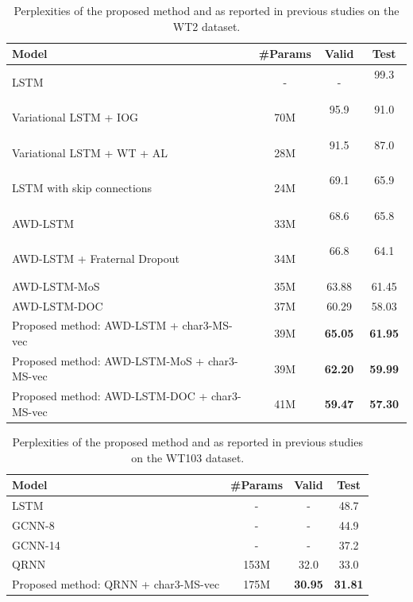 \documentclass[letterpaper]{article} %
\begin{document}
\begin{table}[!t]
  \centering
  \begin{tabular}{ l | c | c c }
  \toprule
  Model & \#Params & Valid & Test \\
  \midrule
  LSTM \cite{DBLP:journals/corr/GraveJU16} & - & - & 99.3 \ \  \\
  Variational LSTM + IOG \cite{takase-suzuki-nagata:2017:I17-2} & 70M & 95.9 \ \  & 91.0 \ \  \\
  Variational LSTM + WT + AL \cite{DBLP:journals/corr/InanKS16} & 28M & 91.5 \ \  & 87.0 \ \  \\
  LSTM with skip connections \cite{DBLP:journals/corr/MelisDB17} & 24M & 69.1 \ \  & 65.9 \ \  \\
  AWD-LSTM \cite{merityRegOpt} & 33M & 68.6 \ \  & 65.8 \ \  \\
  AWD-LSTM + Fraternal Dropout \cite{fraternal} & 34M & 66.8 \ \  & 64.1 \ \  \\
  AWD-LSTM-MoS \cite{DBLP:journals/corr/abs-1711-03953} & 35M & 63.88 & 61.45 \\
  AWD-LSTM-DOC \cite{D18-1489} & 37M & 60.29 & 58.03 \\
  \midrule
  Proposed method: AWD-LSTM + char3-MS-vec & 39M & {\bf 65.05} & {\bf 61.95} \\
  Proposed method: AWD-LSTM-MoS + char3-MS-vec & 39M & {\bf 62.20} & {\bf 59.99} \\
  Proposed method: AWD-LSTM-DOC + char3-MS-vec & 41M & {\bf 59.47} & {\bf 57.30} \\
  \bottomrule
  \end{tabular}
  \caption{Perplexities of the proposed method and as reported in previous studies on the WT2 dataset.\label{tb:perplexityOnWikitext2}}
\end{table}


\begin{table}[!t]
  \centering
  \begin{tabular}{ l | c | c c }
  \toprule
  Model & \#Params & Valid & Test \\
  \midrule
  LSTM \cite{DBLP:journals/corr/GraveJU16} & - & - & 48.7 \\
  GCNN-8 \cite{DBLP:journals/corr/DauphinFAG16} & - & - & 44.9 \\
  GCNN-14 \cite{DBLP:journals/corr/DauphinFAG16} & - & - & 37.2 \\
  QRNN \cite{merityAnalysis} & 153M & 32.0 & 33.0 \\
  \midrule
  Proposed method: QRNN + char3-MS-vec & 175M & {\bf 30.95} & {\bf 31.81} \\
  \bottomrule
  \end{tabular}
  \caption{Perplexities of the proposed method and as reported in previous studies on the WT103 dataset.\label{tb:perplexityOnWikitext103}}
\end{table}
\end{document}
